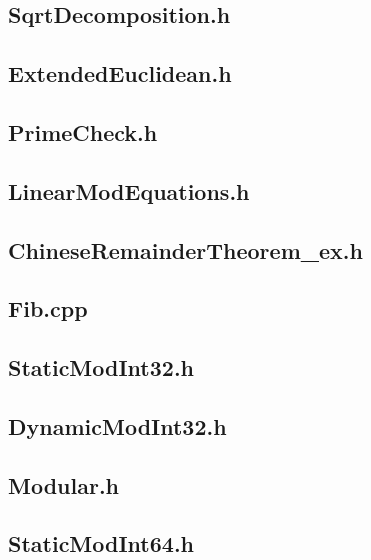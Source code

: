 \subsection{SqrtDecomposition.h}

\subsection{ExtendedEuclidean.h}

\subsection{PrimeCheck.h}

\subsection{LinearModEquations.h}

\subsection{ChineseRemainderTheorem\_ex.h}

\subsection{Fib.cpp}

\subsection{StaticModInt32.h}

\subsection{DynamicModInt32.h}

\subsection{Modular.h}

\subsection{StaticModInt64.h}

